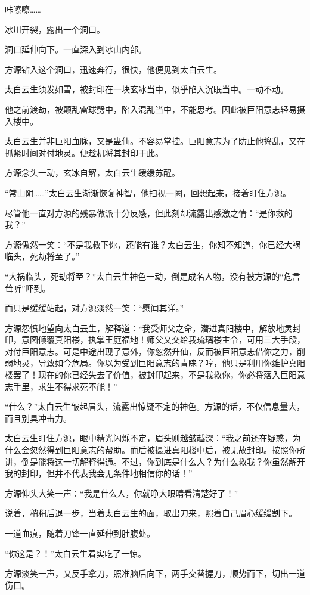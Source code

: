 \begin{this_body}
咔嚓嚓……

冰川开裂，露出一个洞口。

洞口延伸向下。一直深入到冰山内部。

方源钻入这个洞口，迅速奔行，很快，他便见到太白云生。

太白云生须发如雪，被封印在一块玄冰当中，似乎陷入沉眠当中。一动不动。

他之前渡劫，被颠乱雷球劈中，陷入混乱当中，不能思考。因此被巨阳意志轻易摄入楼中。

太白云生并非巨阳血脉，又是蛊仙。不容易掌控。巨阳意志为了防止他捣乱，又在抓紧时间对付地灵。便趁机将其封印于此。

方源念头一动，玄冰自解，太白云生缓缓苏醒。

“常山阴……”太白云生渐渐恢复神智，他扫视一圈，回想起来，接着盯住方源。

尽管他一直对方源的残暴做派十分反感，但此刻却流露出感激之情：“是你救的我？”

方源傲然一笑：“不是我救下你，还能有谁？太白云生，你知不知道，你已经大祸临头，死劫将至了。”

“大祸临头，死劫将至？”太白云生神色一动，倒是成名人物，没有被方源的“危言耸听”吓到。

而只是缓缓站起，对方源淡然一笑：“愿闻其详。”

方源怨愤地望向太白云生，解释道：“我受师父之命，潜进真阳楼中，解放地灵封印，意图倾覆真阳楼，执掌王庭福地！师父又交给我琉璃楼主令，可用三大手段，对付巨阳意志。可是中途出现了意外，你忽然升仙，反而被巨阳意志借你之力，削弱地灵，导致如今危局。你以为受到巨阳意志的青睐？哼，他只是利用你维护真阳楼罢了！现在的你已经失去了价值，被封印起来，不是我救你，你必将落入巨阳意志手里，求生不得求死不能！”

“什么？”太白云生皱起眉头，流露出惊疑不定的神色。方源的话，不仅信息量大，而且别具冲击力。

太白云生盯住方源，眼中精光闪烁不定，眉头则越皱越深：“我之前还在疑惑，为什么会忽然得到巨阳意志的帮助。而后被摄进真阳楼中后，被无故封印。按照你所讲，倒是能将这一切解释得通。不过，你到底是什么人？为什么救我？你虽然解开我的封印，但并不代表我会无条件地相信你的话！”

方源仰头大笑一声：“我是什么人，你就睁大眼睛看清楚好了！”

说着，稍稍后退一步，当着太白云生的面，取出刀来，照着自己眉心缓缓割下。

一道血痕，随着刀锋一直延伸到肚腹处。

“你这是？！”太白云生着实吃了一惊。

方源淡笑一声，又反手拿刀，照准脑后向下，两手交替握刀，顺势而下，切出一道伤口。


\end{this_body}
